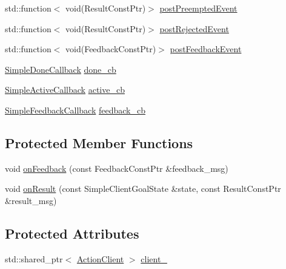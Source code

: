 \begin{DoxyCompactItemize}
\item 
std\+::function$<$ void(Result\+Const\+Ptr)$>$ \hyperlink{classsmacc_1_1client__bases_1_1SmaccActionClientBase_a9513e302d447b04aafbca574d37a9ecc}{post\+Preempted\+Event}
\item 
std\+::function$<$ void(Result\+Const\+Ptr)$>$ \hyperlink{classsmacc_1_1client__bases_1_1SmaccActionClientBase_a04cb60c48127e5534c1ce7045fb5abdc}{post\+Rejected\+Event}
\item 
std\+::function$<$ void(Feedback\+Const\+Ptr)$>$ \hyperlink{classsmacc_1_1client__bases_1_1SmaccActionClientBase_ac754fb0adfc982fe1adde0d92842a33b}{post\+Feedback\+Event}
\item 
\hyperlink{classsmacc_1_1client__bases_1_1SmaccActionClientBase_a56eb842a85c65248fda43909b1aaeac1}{Simple\+Done\+Callback} \hyperlink{classsmacc_1_1client__bases_1_1SmaccActionClientBase_a39fc5030e98f1e30e9919a9d9737b78a}{done\+\_\+cb}
\item 
\hyperlink{classsmacc_1_1client__bases_1_1SmaccActionClientBase_acfd06f7c33418c03a340e74b00a4dddc}{Simple\+Active\+Callback} \hyperlink{classsmacc_1_1client__bases_1_1SmaccActionClientBase_a8aada706b9b8ca50792b48c2f990394a}{active\+\_\+cb}
\item 
\hyperlink{classsmacc_1_1client__bases_1_1SmaccActionClientBase_a207f1655464affc35459f47a35d04069}{Simple\+Feedback\+Callback} \hyperlink{classsmacc_1_1client__bases_1_1SmaccActionClientBase_a978629b407530f1b7d266a009eff664b}{feedback\+\_\+cb}
\end{DoxyCompactItemize}
\subsection*{Protected Member Functions}
\begin{DoxyCompactItemize}
\item 
void \hyperlink{classsmacc_1_1client__bases_1_1SmaccActionClientBase_a5a88fd084076729e9cb864e45338af47}{on\+Feedback} (const Feedback\+Const\+Ptr \&feedback\+\_\+msg)
\item 
void \hyperlink{classsmacc_1_1client__bases_1_1SmaccActionClientBase_a39b897cf72ee070e4172cf76cdd53d5e}{on\+Result} (const Simple\+Client\+Goal\+State \&state, const Result\+Const\+Ptr \&result\+\_\+msg)
\end{DoxyCompactItemize}
\subsection*{Protected Attributes}
\begin{DoxyCompactItemize}
\item 
std\+::shared\+\_\+ptr$<$ \hyperlink{classsmacc_1_1client__bases_1_1SmaccActionClientBase_ab4cb0717885b95d577f82f4133db7f5f}{Action\+Client} $>$ \hyperlink{classsmacc_1_1client__bases_1_1SmaccActionClientBase_ac0c1dd56420ecb53cf0c90cd8bef1b4c}{client\+\_\+}
\end{DoxyCompactItemize}



